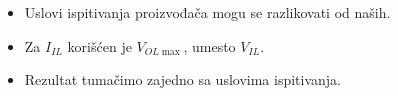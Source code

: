 \begin{frame}[label=08-s028]
\centering\par\bigskip\raggedright
\begin{itemize}
\item Uslovi ispitivanja proizvođača mogu se razlikovati od naših.
\item Za $I_{IL}$ korišćen je $V_{OL\max}$, umesto $V_{IL}$.
\item Rezultat tumačimo zajedno sa uslovima ispitivanja.
\end{itemize}
\end{frame}
